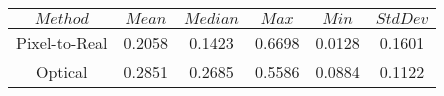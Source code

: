 \begin{table}[h]
\centering
\begin{tabular}{|c|c|c|c|c|c|}
\hline
$Method$ & $Mean$ & $Median$ & $Max$ & $Min$ & $StdDev$ \\
\hline
Pixel-to-Real & 0.2058 & 0.1423 & 0.6698 & 0.0128 & 0.1601 \\
\hline
Optical & 0.2851 & 0.2685 & 0.5586 & 0.0884 & 0.1122 \\
\hline
\end{tabular}
\end{table}
